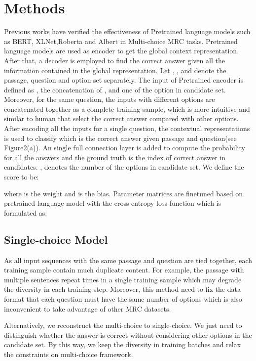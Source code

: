 \documentclass[11pt,a4paper]{article}
\begin{document}
\section{Methods}

Previous works have verified the effectiveness of Pretrained language models such as BERT, XLNet,Roberta and Albert in Multi-choice MRC tasks. Pretrained language models are used as encoder to get the global context representation. After that, a decoder is employed to find the correct answer given all the information contained in the global representation.
Let , , and  denote the passage, question and option set separately.
The input of Pretrained encoder is defined as , the concatenation of ,  and  one of the option in candidate set.
Moreover, for the same question, the inputs with different options are concatenated  together as a complete training sample, which is more intuitive and similar to human that select the correct answer compared with other options. After encoding all the inputs for a single question, the contextual representations  is used to classify which is the correct answer given passage and question(see Figure2(a)). An single full connection layer is added to compute the probability  for all the answers and the ground truth  is the index of correct answer in candidates. ,  denotes the number of the options in candidate set. We define the score to be:

where  is the weight and  is the bias. Parameter matrices are finetuned based on pretrained language model with the cross entropy loss function which is formulated as:


\subsection{Single-choice Model}
As all input sequences with the same passage and question are tied together, each training sample contain much duplicate content. For example, the passage with multiple sentences repeat  times in a single training sample which may degrade the diversity in each training step.
Moreover, this method need to fix the data format that each question must have the same number of options which is also inconvenient to take advantage of other MRC datasets.

Alternatively, we reconstruct the multi-choice to single-choice.
We just need to distinguish whether the answer is correct without considering other options in the candidate set. By this way, we keep the diversity in training batches and relax the constraints on multi-choice framework.
\end{document}
